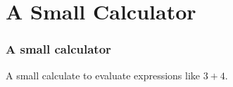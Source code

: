 \documentclass[xcolor=svgnames]{beamer}
\renewcommand{\_}{\mathunderscore}
\begin{document}











\section{A Small Calculator}

\begin{frame}[fragile]
  \frametitle{A small calculator}
  A small calculate to evaluate expressions like $3 + 4$.
  
\end{frame}
\end{document}
